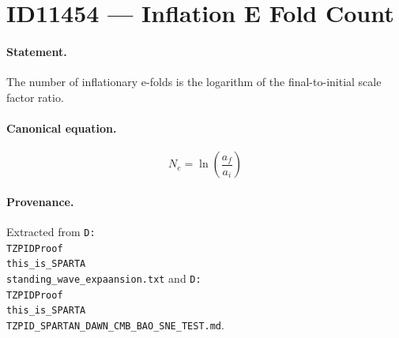 \section*{ID11454 --- Inflation E Fold Count}

\paragraph{Statement.}
The number of inflationary e-folds is the logarithm of the final-to-initial scale factor ratio.

\paragraph{Canonical equation.}
\[
N_e=\ln\left(\frac{a_f}{a_i}\right)
\]

\paragraph{Provenance.}
Extracted from \texttt{D:\\TZPIDProof\\this\_is\_SPARTA\\standing\_wave\_expaansion.txt} and \texttt{D:\\TZPIDProof\\this\_is\_SPARTA\\TZPID\_SPARTAN\_DAWN\_CMB\_BAO\_SNE\_TEST.md}.
